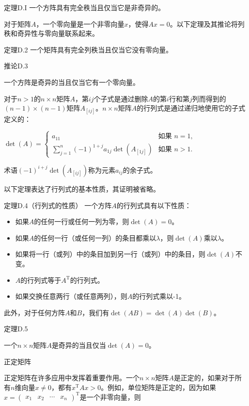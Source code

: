 \documentclass[lang=cn,newtx,10pt,scheme=chinese]{elegantbook}
\begin{document}
定理D.I
一个方阵具有完全秩当且仅当它是非奇异的。

对于矩阵$A$，一个零向量是一个非零向量$x$，使得$Ax=0$。以下定理及其推论将列秩和奇异性与零向量联系起来。

定理D.2
一个矩阵具有完全列秩当且仅当它没有零向量。

推论D.3

一个方阵是奇异的当且仅当它有一个零向量。

对于$n>1$的$n \times n$矩阵$A$，第$i j$个子式是通过删除$A$的第$i$行和第$j$列而得到的$(n-1) \times(n-1)$矩阵$A_{[i j]}$。$n \times n$矩阵$A$的行列式是通过递归地使用它的子式定义的：

$\operatorname{det}(A)= \begin{cases}a_{11} & \text {如果 } n=1, \\ \sum_{j=1}^n(-1)^{1+j} a_{1 j} \operatorname{det}(A_{[1 j]}) & \text {如果 } n>1 .\end{cases}$

术语$(-1)^{i+j} \operatorname{det}(A_{[i j]})$称为元素$a_{i j}$的余子式。

以下定理表达了行列式的基本性质，其证明被省略。

定理D.4（行列式的性质）
一个方阵$A$的行列式具有以下性质：
\begin{itemize}
\item 如果$A$的任何一行或任何一列为零，则$\operatorname{det}(A)=0$。
\item 如果$A$的任何一行（或任何一列）的条目都乘以$\lambda$，则$\operatorname{det}(A)$乘以$\lambda$。
\item 如果将一行（或列）中的条目加到另一行（或列）中的条目，则$\operatorname{det}(A)$不变。
\item $A$的行列式等于$A^{\mathrm{T}}$的行列式。
\item 如果交换任意两行（或任意两列），则$A$的行列式乘以-1。
\end{itemize}

此外，对于任何方阵$A$和$B$，我们有$\operatorname{det}(AB)=\operatorname{det}(A) \operatorname{det}(B)$。

定理D.5

一个$n \times n$矩阵$A$是奇异的当且仅当$\operatorname{det}(A)=0$。

正定矩阵

正定矩阵在许多应用中发挥着重要作用。一个$n \times n$矩阵$A$是正定的，如果对于所有$n$维向量$x \neq 0$，都有$x^{\mathrm{T}} A x>0$。例如，单位矩阵是正定的，因为如果$x=(\begin{array}{llll}x_1 & x_2 & \cdots & x_n\end{array})^{\mathrm{T}}$是一个非零向量，则
\end{document}

